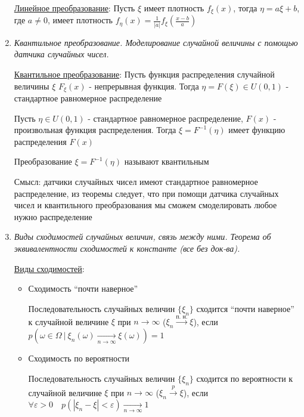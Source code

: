 \begin{enumerate}
    \hyperlink{lineartransformation}{Линейное преобразование}: \Ths Пусть $\xi$ имеет плотность $f_\xi(x)$, тогда $\eta = a\xi + b$, где $a \neq 0$, имеет плотность $f_\eta(x) = \frac{1}{|a|}f_\xi\left(\frac{x - b}{a}\right)$
    
    \item \textit{Квантильное преобразование. Моделирование случайной величины с помощью датчика случайных чисел.}

    \hyperlink{quantiletransformation}{Квантильное преобразование}: Пусть функция распределения случайной величины $\xi$ $F_\xi(x)$ - непрерывная функция. 
    Тогда $\eta = F(\xi) \in U(0, 1)$ - стандартное равномерное распределение

    Пусть $\eta \in U(0, 1)$ - стандартное равномерное распределение, $F(x)$ - произвольная функция распределения. 
    Тогда $\xi = F^{-1}(\eta)$ имеет функцию распределения $F(x)$

    Преобразование $\xi = F^{-1}(\eta)$ называют квантильным

    Смысл: датчики случайных чисел имеют стандартное равномерное распределение, из теоремы следует, что при помощи
    датчика случайных чисел и квантильного преобразования мы сможем смоделировать любое нужно распределение


    \item \textit{Виды сходимостей случайных величин, связь между ними. Теорема об эквивалентности сходимостей к константе (все без док-ва).}

    \hyperlink{convergencetypes}{Виды сходимостей}:

    \begin{itemize}
        \item Сходимость \enquote{почти наверное}

        \Defs Последовательность случайных величин $\{\xi_n\}$ сходится \enquote{почти наверное} к случайной величине $\xi$ при $n \to \infty$ ($\xi_n \overset{\text{п. н.}}{\longrightarrow} \xi$), 
        если $p(\omega \in \Omega \ | \ \xi_n(\omega) \underset{n \to \infty}{\longrightarrow} \xi(\omega)) = 1$

        \item Сходимость по вероятности

        \Defs Последовательность случайных величин $\{\xi_n\}$ сходится по вероятности к случайной величине $\xi$ при $n \to \infty$
        ($\xi_n \overset{p}{\longrightarrow} \xi$), если $\forall \varepsilon > 0 \quad p(|\xi_n - \xi| < \varepsilon) \underset{n \to \infty}{\longrightarrow} 1$
        

\end{itemize}
\end{enumerate}
